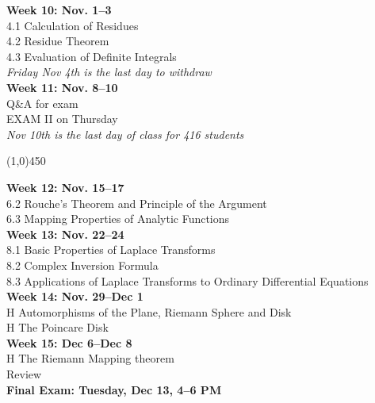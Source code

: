 \documentclass[11pt]{article}
\begin{document}
{\bf Week 10: Nov. 1--3}\\
4.1 Calculation of Residues\\
4.2 Residue Theorem\\
4.3 Evaluation of Definite Integrals\\
{\it  Friday Nov 4th is the last day to withdraw}\\

{\bf Week 11: Nov. 8--10}\\
Q\&A for exam\\ 
EXAM II on Thursday\\ 
\textit{Nov 10th is the last day of class for 416 students}\\

\begin{center}
	\line(1,0){450}
\end{center}


{\bf Week 12: Nov. 15--17}\\
6.2 Rouche's Theorem and Principle of the Argument\\
6.3 Mapping Properties of Analytic Functions\\

{\bf Week 13: Nov. 22--24}\\
8.1 Basic Properties of Laplace Transforms\\
8.2 Complex Inversion Formula\\
8.3 Applications of Laplace Transforms to Ordinary Differential Equations\\

{\bf Week 14: Nov. 29--Dec 1}\\
H Automorphisms of the Plane, Riemann Sphere and Disk\\
H The Poincare Disk\\

{\bf Week 15: Dec 6--Dec 8}\\
H The Riemann Mapping theorem\\
Review\\

{\bf Final Exam: Tuesday, Dec 13, 4--6 PM}
\end{document}
